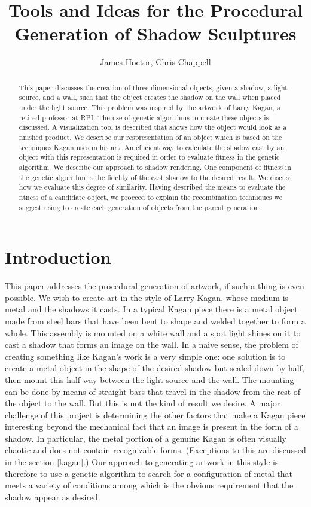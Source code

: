 \documentclass[10pt]{article}
\title{Tools and Ideas for the Procedural Generation of Shadow Sculptures}
\author{James Hoctor, Chris Chappell}
\begin{document}
\maketitle


\begin{abstract}
This paper discusses the creation of three dimensional objects,
given a shadow, a light source, and a wall, such that the object
creates the shadow on the wall when placed under the light source.
This problem was inspired by the artwork of Larry Kagan, a retired
professor at RPI. The use of genetic
algorithms to create these objects is discussed. A visualization
tool is described that shows how the object would look as a finished
product. We describe our respresentation of an object which is based
on the techniques Kagan uses in his art. An efficient way to
calculate the shadow cast by an object with this representation is
required in order to evaluate fitness in the genetic algorithm. We
describe our approach to shadow rendering. One component of fitness
in the genetic algorithm is the fidelity of the cast shadow to the
desired result. We discuss how we evaluate this degree of similarity.
Having described the means to evaluate the fitness of a
candidate object, we proceed to explain the recombination techniques
we suggest using to create each generation of objects from the parent generation.
\end{abstract}

\section*{Introduction}
This paper addresses the procedural generation of artwork, if such
a thing is even possible. We wish to create art in the style of
Larry Kagan, whose medium is metal and the shadows it casts. In a
typical Kagan piece there is a metal object made from steel bars
that have been bent to shape and welded together to form a whole.
This assembly is mounted on a white wall and a spot light
shines on it to cast a shadow that forms an image on the wall. In a
naive sense, the problem  of creating something like Kagan's work is
a very simple one: one solution is to create a metal object in the shape of the desired
shadow but scaled down by half, then mount this half way between the
light source and the wall. The mounting can be done by means of
straight bars that travel in the shadow from the rest of the object
to the wall. But this is not the kind of result we desire. A major
challenge of this project is determining the other factors that make
a Kagan piece interesting beyond the mechanical fact that an image
is present in the form of a shadow. In particular, the metal portion
of a genuine Kagan is often visually chaotic and does not contain
recognizable forms. (Exceptions to this are discussed in the section
\ref{kagan}.) Our approach to generating artwork in this style
is therefore to use a genetic algorithm to search for a configuration
of metal that meets a variety of conditions among which is the
obvious requirement that the shadow appear as desired.
\end{document}
